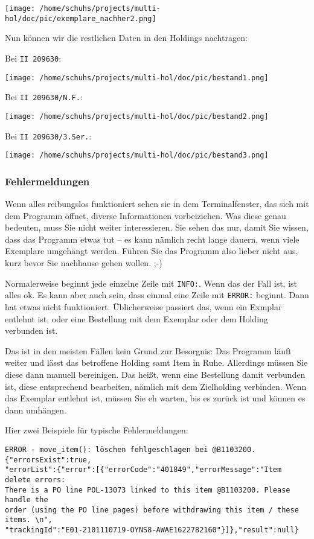 \documentclass[10pt, a4paper]{scrartcl}
\begin{document}
\begin{enumerate}
\begin{center}
\texttt{[image: /home/schuhs/projects/multi-hol/doc/pic/exemplare\_nachher2.png]}
\end{center}

Nun können wir die restlichen Daten in den Holdings nachtragen:

Bei \texttt{II 209630}:
\begin{center}
\texttt{[image: /home/schuhs/projects/multi-hol/doc/pic/bestand1.png]}
\end{center}

Bei \texttt{II 209630/N.F.}:
\begin{center}
\texttt{[image: /home/schuhs/projects/multi-hol/doc/pic/bestand2.png]}
\end{center}

Bei \texttt{II 209630/3.Ser.}:
\begin{center}
\texttt{[image: /home/schuhs/projects/multi-hol/doc/pic/bestand3.png]}
\end{center}
\end{enumerate}
\subsubsection{Fehlermeldungen}
\label{sec:org7455f5e}
Wenn alles reibungslos funktioniert sehen sie in dem Terminalfenster, das
sich mit dem Programm öffnet, diverse Informationen vorbeiziehen. Was
diese genau bedeuten, muss Sie nicht weiter interessieren. Sie sehen das
nur, damit Sie wissen, dass das Programm etwas tut -- es kann nämlich
recht lange dauern, wenn viele Exemplare umgehängt werden. Führen Sie das
Programm also lieber nicht aus, kurz bevor Sie nachhause gehen wollen. ;-)

Normalerweise beginnt jede einzelne Zeile mit \texttt{INFO:}. Wenn das der Fall
ist, ist alles ok. Es kann aber auch sein, dass einmal eine Zeile mit
\texttt{ERROR:} beginnt. Dann hat etwas nicht funktioniert. Üblicherweise
passiert das, wenn ein Exmplar entlehnt ist, oder eine Bestellung mit dem
Exemplar oder dem Holding verbunden ist.

Das ist in den meisten Fällen kein Grund zur Besorgnis: Das Programm läuft
weiter und lässt das betroffene Holding samt Item in Ruhe. Allerdings
müssen Sie diese dann manuell bereinigen. Das heißt, wenn eine Bestellung
damit verbunden ist, diese entsprechend bearbeiten, nämlich mit dem
Zielholding verbinden. Wenn das Exemplar entlehnt ist, müssen Sie eh
warten, bis es zurück ist und können es dann umhängen.

Hier zwei Beispiele für typische Fehlermeldungen:

\label{org6ba1dfd}
\begin{verbatim}
ERROR - move_item(): löschen fehlgeschlagen bei @B1103200. {"errorsExist":true,
"errorList":{"error":[{"errorCode":"401849","errorMessage":"Item delete errors:
There is a PO line POL-13073 linked to this item @B1103200. Please handle the 
order (using the PO line pages) before withdrawing this item / these items. \n",
"trackingId":"E01-2101110719-OYNS8-AWAE1622782160"}]},"result":null}
\end{verbatim}
\end{document}
